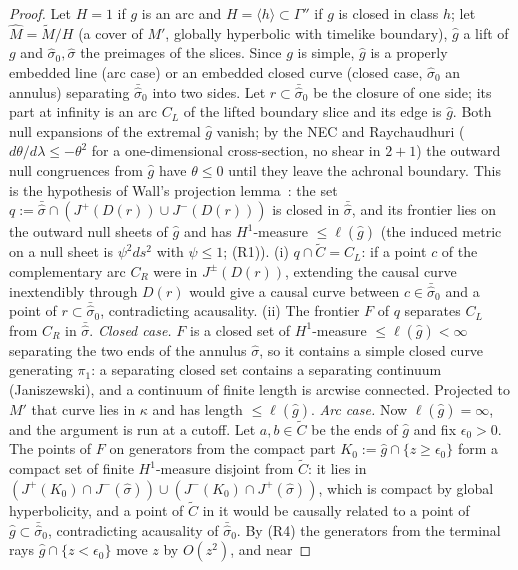 \documentclass[aps,prd,onecolumn,superscriptaddress,nofootinbib,amsmath,amssymb,11pt]{revtex4-2}
\theoremstyle{definition}
\newcommand{\eps}{\epsilon}
\begin{document}
\begin{proof}
Let $H=1$ if $g$ is an arc and $H=\langle h\rangle\subset\Gamma''$ if $g$ is closed in class $h$; let $\widehat M=\tilde M/H$ (a cover of
$M'$, globally hyperbolic with timelike boundary), $\hat g$ a lift of $g$ and $\hat\sigma_0,\hat\sigma$ the preimages of the slices.
Since $g$ is simple, $\hat g$ is a properly embedded line (arc case) or an embedded closed curve (closed case, $\hat\sigma_0$ an
annulus) separating $\bar{\hat\sigma}_0$ into two sides.
Let $r\subset\bar{\hat\sigma}_0$ be the closure of one side; its part at infinity is an arc $C_L$ of the lifted boundary slice and
its edge is $\hat g$. Both null expansions of the extremal $\hat g$ vanish; by the NEC and Raychaudhuri ($d\theta/d\lambda\le-\theta^2$
for a one-dimensional cross-section, no shear in $2+1$) the outward null congruences from $\hat g$ have $\theta\le0$ until they
leave the achronal boundary. This is the hypothesis of Wall's projection lemma~\cite{Wall2014}: the set
$q:=\bar{\hat\sigma}\cap(J^+(D(r))\cup J^-(D(r)))$ is closed in $\bar{\hat\sigma}$, and its frontier lies on the outward null sheets of
$\hat g$ and has $H^1$-measure $\le\ell(\hat g)$ (the induced metric on a null sheet is $\psi^2ds^2$ with $\psi\le1$; (R1)).
(i) $q\cap\tilde C=C_L$: if a point $c$ of the complementary arc $C_R$ were in $J^\pm(D(r))$, extending the causal curve
inextendibly through $D(r)$ would give a causal curve between $c\in\bar{\hat\sigma}_0$ and a point of $r\subset\bar{\hat\sigma}_0$,
contradicting acausality. (ii) The frontier $F$ of $q$ separates $C_L$ from $C_R$ in $\bar{\hat\sigma}$.
\emph{Closed case.} $F$ is a closed set of $H^1$-measure $\le\ell(\hat g)<\infty$ separating the two ends of the annulus $\hat\sigma$, so it
contains a simple closed curve generating $\pi_1$: a separating closed set contains a separating continuum (Janiszewski), and a
continuum of finite length is arcwise connected. Projected to $M'$ that curve lies in $\kappa$ and has length $\le\ell(\hat g)$.
\emph{Arc case.} Now $\ell(\hat g)=\infty$, and the argument is run at a cutoff. Let $a,b\in\tilde C$ be the ends of $\hat g$ and fix $\eps_0>0$.
The points of $F$ on generators from the compact part $K_0:=\hat g\cap\{z\ge\eps_0\}$ form a compact set of finite $H^1$-measure
disjoint from $\tilde C$: it lies in $(J^+(K_0)\cap J^-(\hat\sigma))\cup(J^-(K_0)\cap J^+(\hat\sigma))$, which is compact by global
hyperbolicity, and a point of $\tilde C$ in it would be causally related to a point of $\hat g\subset\bar{\hat\sigma}_0$, contradicting
acausality of $\bar{\hat\sigma}_0$. By (R4) the generators from the terminal rays $\hat g\cap\{z<\eps_0\}$ move $z$ by $O(z^2)$, and near

\end{proof}
\end{document}

